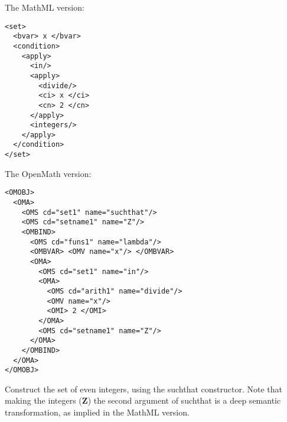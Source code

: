 \documentclass[twoside,11pt]{article}
\begin{document}
\begin{center}
\begin{mybox}{4.5in}
The MathML version:
\begin{verbatim}
<set>
  <bvar> x </bvar>
  <condition>
    <apply>
      <in/>
      <apply>
        <divide/>
        <ci> x </ci>
        <cn> 2 </cn>
      </apply>
      <integers/>
    </apply>
  </condition>
</set>
\end{verbatim}

The OpenMath version:
\begin{verbatim}
<OMOBJ>
  <OMA>
    <OMS cd="set1" name="suchthat"/>
    <OMS cd="setname1" name="Z"/>
    <OMBIND>
      <OMS cd="funs1" name="lambda"/>
      <OMBVAR> <OMV name="x"/> </OMBVAR>
      <OMA>
        <OMS cd="set1" name="in"/>
        <OMA>
          <OMS cd="arith1" name="divide"/>
          <OMV name="x"/>
          <OMI> 2 </OMI>
        </OMA>
        <OMS cd="setname1" name="Z"/>
      </OMA>
    </OMBIND>
  </OMA>
</OMOBJ>
\end{verbatim}
\end{mybox}
\end{center}
\begin{center}
Construct the set of even integers, using the suchthat
constructor. Note that making the integers ({\bf Z}) the second
argument of suchthat is a deep semantic transformation, as implied in
the MathML version.
\end{center}
\begin{equation}\label{set-suchthat}
\end{equation}
\end{document}
